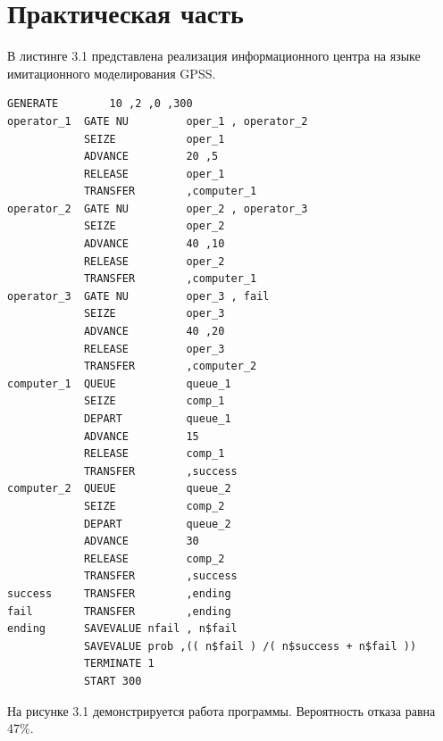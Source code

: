 \chapter{Практическая часть}

В листинге 3.1 представлена реализация информационного центра на
языке имитационного моделирования GPSS.

\begin{lstlisting}[caption=Реализация системы массового обслуживания]
			GENERATE 		10 ,2 ,0 ,300
operator_1  GATE NU 		oper_1 , operator_2
			SEIZE 			oper_1
			ADVANCE 		20 ,5
			RELEASE 		oper_1
			TRANSFER 		,computer_1
operator_2  GATE NU 		oper_2 , operator_3
			SEIZE 			oper_2
			ADVANCE 		40 ,10
			RELEASE 		oper_2
			TRANSFER 		,computer_1
operator_3  GATE NU 		oper_3 , fail
			SEIZE			oper_3
			ADVANCE 		40 ,20
			RELEASE 		oper_3
		    TRANSFER 		,computer_2
computer_1  QUEUE 			queue_1
			SEIZE 			comp_1
			DEPART 			queue_1
			ADVANCE 		15
			RELEASE 		comp_1
			TRANSFER 		,success
computer_2  QUEUE		 	queue_2
			SEIZE 			comp_2
			DEPART 			queue_2
			ADVANCE 		30
			RELEASE 		comp_2
			TRANSFER 		,success
success 	TRANSFER 		,ending
fail 		TRANSFER 		,ending
ending 		SAVEVALUE nfail , n$fail
			SAVEVALUE prob ,(( n$fail ) /( n$success + n$fail ))
			TERMINATE 1
			START 300
\end{lstlisting}

На рисунке 3.1 демонстрируется работа программы. Вероятность отказа равна 47\%.

